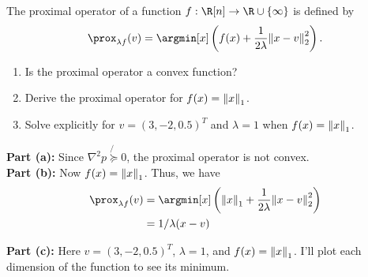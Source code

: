 \documentclass[11pt]{article}
\begin{document}
\pagebreak

\begin{homeworkProblem}
    The proximal operator of a function $f : \R[n] \rightarrow \R \cup \{\infty\}$ is defined by
    \[
        \prox_{\lambda f}(v) = \argmin[x] \left(f(x) + \frac{1}{2\lambda} \norm{x - v}_2^2\right).
    \]
    \begin{enumerate}[label=(\alph*), topsep=5pt, itemsep=2.5pt]
        \item Is the proximal operator a convex function?
        \item Derive the proximal operator for $f(x) = \norm{x}_1$.
        \item Solve explicitly for $v = (3, -2, 0.5)^T$ and $\lambda = 1$ when $f(x) = \norm{x}_1$.
    \end{enumerate} \vspace{1\baselineskip}

    \solution

    \textbf{Part (a):} Since $\nabla^2 p \not{\succeq} 0$, the proximal operator is not convex. \\

    \textbf{Part (b):} Now $f(x) = \norm{x}_1$. Thus, we have
    \begin{align*}
        \prox_{\lambda f}(v) & = \argmin[x] \left(\norm{x}_1 + \frac{1}{2\lambda} \norm{x - v}_2^2\right) \\
                             & = 1/\lambda (x-v)
    \end{align*}


    \textbf{Part (c):} Here $v = (3, -2, 0.5)^T$, $\lambda = 1$, and $f(x) = \norm{x}_1$. I'll plot each dimension of the function to see its minimum.

    \begin{figure}[hbpt!]
        \centering
\end{figure}
\end{homeworkProblem}
\end{document}
